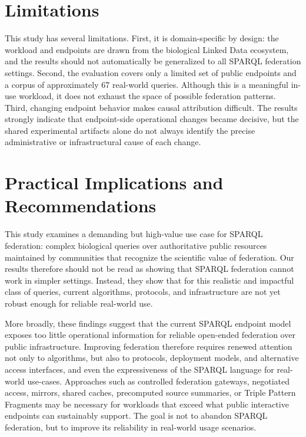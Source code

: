 \documentclass[runningheads]{llncs}
\begin{document}
\section{Limitations}\label{sec7}

This study has several limitations. 
First, it is domain-specific by design: the workload and endpoints are drawn from the biological Linked Data ecosystem, and the results should not automatically be generalized to all SPARQL federation settings. 
Second, the evaluation covers only a limited set of public endpoints and a corpus of approximately 67 real-world queries. 
Although this is a meaningful in-use workload, it does not exhaust the space of possible federation patterns.
Third, changing endpoint behavior makes causal attribution difficult. 
The results strongly indicate that endpoint-side operational changes became decisive, but the shared experimental artifacts alone do not always identify the precise administrative or infrastructural cause of each change. 

\section{Practical Implications and Recommendations}\label{sec8}
This study examines a demanding but high-value use case for SPARQL federation: complex biological queries over authoritative public resources maintained by communities that recognize the scientific value of federation. 
Our results therefore should not be read as showing that SPARQL federation cannot work in simpler settings. 
Instead, they show that for this realistic and impactful class of queries, current algorithms, protocols, and infrastructure are not yet robust enough for reliable real-world use.

More broadly, these findings suggest that the current SPARQL endpoint model exposes too little operational information for reliable open-ended federation over public infrastructure. 
Improving federation therefore requires renewed attention not only to algorithms, but also to protocols, deployment models, and alternative access interfaces, and even the expressiveness of the SPARQL language for real-world use-cases. 
Approaches such as controlled federation gateways, negotiated access, mirrors, shared caches, precomputed source summaries, or Triple Pattern Fragments\cite{Verborgh2016TPF} may be necessary for workloads that exceed what public interactive endpoints can sustainably support. 
The goal is not to abandon SPARQL federation, but to improve its reliability in real-world usage scenarios. 
\end{document}

